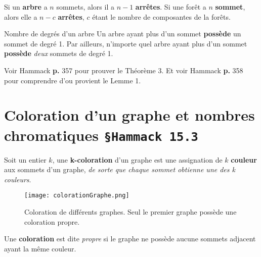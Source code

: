 \documentclass[16pt]{report}
\begin{document}
\begin{multicols*}{2}
            \begin{Theorem}{}
                Si un \textbf{arbre} a $n$ sommets, alors il a $n - 1$ \textbf{arrêtes}. Si une forêt a 
                $n$ \textbf{sommet}, alors elle a $n - c$ \textbf{arrêtes}, $c$ étant le nombre de 
                composantes de la forêts. 
            \end{Theorem}


            \begin{Lemme}{Nombre de degrés d'un arbre}{}
                Un arbre ayant plus d'un sommet \textbf{possède} un sommet de degré 1. Par ailleurs, 
                n'importe quel arbre ayant plus d'un sommet \textbf{possède} \textit{deux} sommets 
                de degré 1. 
            \end{Lemme}

            \begin{note}{}{}
                Voir Hammack \textbf{p.} 357 pour prouver le Théorème 3. Et voir Hammack \textbf{p.} 358 
                pour comprendre d'ou provient le Lemme 1. 
            \end{note}



                
    \section{Coloration d'un graphe et nombres chromatiques \texttt{\small{\S Hammack 15.3}}}

            
            \begin{Concept}{}{}
                Soit un entier $k$, une \textbf{k-coloration} d'un graphe est une assignation de $k$ 
                \textbf{couleur} aux sommets d'un graphe, \textit{de sorte que chaque sommet obtienne une des 
                k couleurs}.    
            \end{Concept}

            \begin{figure}[H]
                \begin{center}
                    \texttt{[image: colorationGraphe.png]}
                \end{center}
                \caption{Coloration de différents graphes. Seul le premier graphe possède une coloration propre.}
            \end{figure}
            

            Une \textbf{coloration} est dite \textit{propre} si le graphe ne possède aucune sommets 
            adjacent ayant la même couleur. 



\end{multicols*}
\end{document}
